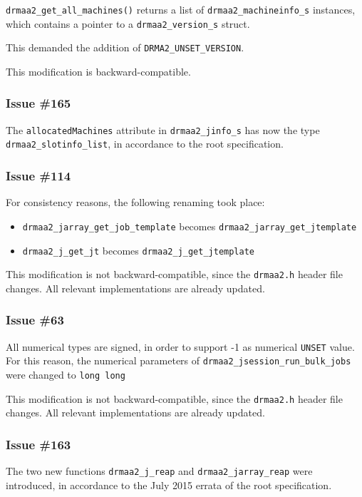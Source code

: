 \documentclass{article}
\newcommand{\h}[1]{\texttt{#1}}
\begin{document}
\h{drmaa2\_get\_all\_machines()} returns a list of \h{drmaa2\_machineinfo\_s} instances, which contains a pointer to a \h{drmaa2\_version\_s} struct.

This demanded the addition of \h{DRMA2\_UNSET\_VERSION}.

This modification is backward-compatible.

\subsubsection*{Issue \#165}

The \h{allocatedMachines} attribute in \h{drmaa2\_jinfo\_s} has now the type \h{drmaa2\_slotinfo\_list}, in accordance to the root specification.

\subsubsection*{Issue \#114}

For consistency reasons, the following renaming took place:

\begin{itemize}
	\item \h{drmaa2\_jarray\_get\_job\_template} becomes \h{drmaa2\_jarray\_get\_jtemplate}
	\item \h{drmaa2\_j\_get\_jt} becomes \h{drmaa2\_j\_get\_jtemplate}
\end{itemize}

This modification is not backward-compatible, since the \h{drmaa2.h} header file changes. All relevant implementations are already updated.

\subsubsection*{Issue \#63}

All numerical types are signed, in order to support -1 as numerical \h{UNSET} value. For this reason, the numerical parameters of \h{drmaa2\_jsession\_run\_bulk\_jobs} were changed to \h{long long}

This modification is not backward-compatible, since the \h{drmaa2.h} header file changes. All relevant implementations are already updated.

\subsubsection*{Issue \#163}

The two new functions \h{drmaa2\_j\_reap} and \h{drmaa2\_jarray\_reap} were introduced, in accordance to the July 2015 errata of the root specification.
\end{document}
